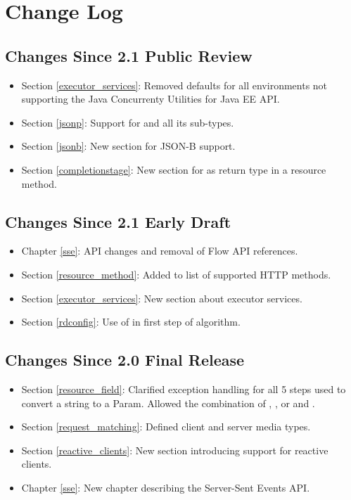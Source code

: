 \chapter{Change Log}

\section{Changes Since 2.1 Public Review}

\begin{itemize}
	\item Section \ref{executor_services}: Removed defaults for all environments not supporting the Java Concurrenty Utilities for Java EE API.
	\item Section \ref{jsonp}: Support for  and all its sub-types.
	\item Section \ref{jsonb}: New section for JSON-B support.
	\item Section \ref{completionstage}: New section for  as return type in a resource method.
\end{itemize}

\section{Changes Since 2.1 Early Draft}

\begin{itemize}
\item Chapter \ref{sse}: API changes and removal of Flow API references.
\item Section \ref{resource_method}: Added  to list of supported HTTP methods.
\item Section \ref{executor_services}: New section about executor services.
\item Section \ref{rdconfig}: Use of  in first step of algorithm.
\end{itemize}

\section{Changes Since 2.0 Final Release}

\begin{itemize}
\item Section \ref{resource_field}: Clarified exception handling for all 5 steps used to convert a string to a Param. Allowed the combination of , , or  and \ParamConverter.
\item Section \ref{request_matching}: Defined client and server media types.
\item Section \ref{reactive_clients}: New section introducing support for reactive clients.
\item Chapter \ref{sse}: New chapter describing the Server-Sent Events API.
\end{itemize}

